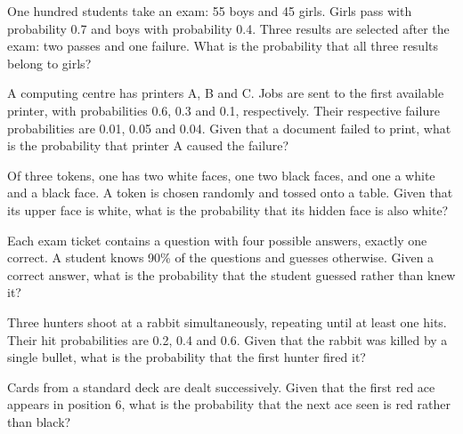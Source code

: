 \documentclass[a4paper]{report}
\begin{document}
\begin{problembook}
One hundred students take an exam: 55 boys and 45 girls. Girls pass with probability 0.7 and boys with probability 0.4. Three results are selected after the exam: two passes and one failure. What is the probability that all three results belong to girls?
\end{problembook}
\begin{problem}
A computing centre has printers A, B and C. Jobs are sent to the first available printer, with probabilities 0.6, 0.3 and 0.1, respectively. Their respective failure probabilities are 0.01, 0.05 and 0.04. Given that a document failed to print, what is the probability that printer A caused the failure?
\end{problem}
\begin{problem}
Of three tokens, one has two white faces, one two black faces, and one a white and a black face. A token is chosen randomly and tossed onto a table. Given that its upper face is white, what is the probability that its hidden face is also white?
\end{problem}
\begin{problem}
Each exam ticket contains a question with four possible answers, exactly one correct. A student knows 90\% of the questions and guesses otherwise. Given a correct answer, what is the probability that the student guessed rather than knew it?
\end{problem}
\begin{problem}
Three hunters shoot at a rabbit simultaneously, repeating until at least one hits. Their hit probabilities are 0.2, 0.4 and 0.6. Given that the rabbit was killed by a single bullet, what is the probability that the first hunter fired it?
\end{problem}
\begin{problem}
Cards from a standard deck are dealt successively. Given that the first red ace appears in position 6, what is the probability that the next ace seen is red rather than black?
\end{problem}
\end{document}
